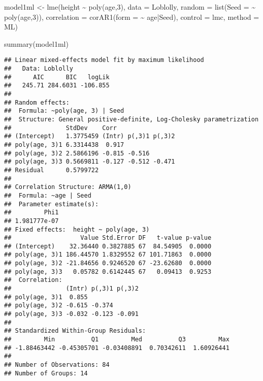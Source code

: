 \documentclass[
]{book}
\newenvironment{Shaded}{\begin{snugshade}}{\end{snugshade}}
\newcommand{\AttributeTok}[1]{\textcolor[rgb]{0.77,0.63,0.00}{#1}}
\newcommand{\DecValTok}[1]{\textcolor[rgb]{0.00,0.00,0.81}{#1}}
\newcommand{\FunctionTok}[1]{\textcolor[rgb]{0.00,0.00,0.00}{#1}}
\newcommand{\NormalTok}[1]{#1}
\newcommand{\OtherTok}[1]{\textcolor[rgb]{0.56,0.35,0.01}{#1}}
\newcommand{\SpecialCharTok}[1]{\textcolor[rgb]{0.00,0.00,0.00}{#1}}
\newcommand{\StringTok}[1]{\textcolor[rgb]{0.31,0.60,0.02}{#1}}
\begin{document}
\begin{Shaded}
\begin{Highlighting}[]
\NormalTok{model1ml }\OtherTok{\textless{}{-}} \FunctionTok{lme}\NormalTok{(height }\SpecialCharTok{\textasciitilde{}} \FunctionTok{poly}\NormalTok{(age,}\DecValTok{3}\NormalTok{), }\AttributeTok{data =}\NormalTok{ Loblolly,}
\AttributeTok{random =} \FunctionTok{list}\NormalTok{(}\AttributeTok{Seed =} \SpecialCharTok{\textasciitilde{}} \FunctionTok{poly}\NormalTok{(age,}\DecValTok{3}\NormalTok{)),}
\AttributeTok{correlation =} \FunctionTok{corAR1}\NormalTok{(}\AttributeTok{form =} \SpecialCharTok{\textasciitilde{}}\NormalTok{ age}\SpecialCharTok{|}\NormalTok{Seed), }\AttributeTok{control =}\NormalTok{ lmc, }\AttributeTok{method =} \StringTok{\textquotesingle{}ML\textquotesingle{}}\NormalTok{)}

\FunctionTok{summary}\NormalTok{(model1ml)}
\end{Highlighting}
\end{Shaded}

\begin{verbatim}
## Linear mixed-effects model fit by maximum likelihood
##   Data: Loblolly 
##      AIC      BIC   logLik
##   245.71 284.6031 -106.855
## 
## Random effects:
##  Formula: ~poly(age, 3) | Seed
##  Structure: General positive-definite, Log-Cholesky parametrization
##               StdDev    Corr                
## (Intercept)   1.3775459 (Intr) p(,3)1 p(,3)2
## poly(age, 3)1 6.3314438  0.917              
## poly(age, 3)2 2.5866196 -0.815 -0.516       
## poly(age, 3)3 0.5669811 -0.127 -0.512 -0.471
## Residual      0.5799722                     
## 
## Correlation Structure: ARMA(1,0)
##  Formula: ~age | Seed 
##  Parameter estimate(s):
##         Phi1 
## 1.981777e-07 
## Fixed effects:  height ~ poly(age, 3) 
##                   Value Std.Error DF   t-value p-value
## (Intercept)    32.36440 0.3827885 67  84.54905  0.0000
## poly(age, 3)1 186.44570 1.8329552 67 101.71863  0.0000
## poly(age, 3)2 -21.84656 0.9246520 67 -23.62680  0.0000
## poly(age, 3)3   0.05782 0.6142445 67   0.09413  0.9253
##  Correlation: 
##               (Intr) p(,3)1 p(,3)2
## poly(age, 3)1  0.855              
## poly(age, 3)2 -0.615 -0.374       
## poly(age, 3)3 -0.032 -0.123 -0.091
## 
## Standardized Within-Group Residuals:
##         Min          Q1         Med          Q3         Max 
## -1.88463442 -0.45305701 -0.03408891  0.70342611  1.60926441 
## 
## Number of Observations: 84
## Number of Groups: 14
\end{verbatim}
\end{document}
